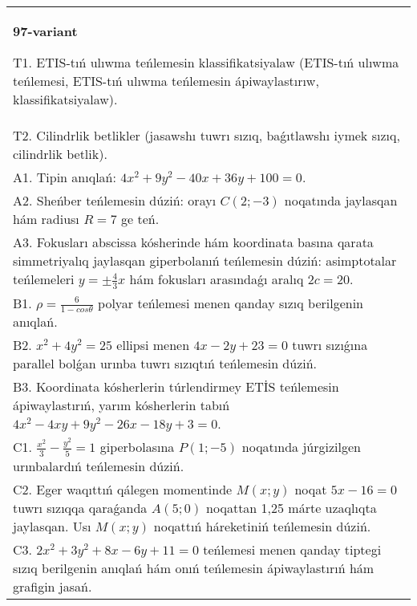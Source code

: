 \documentclass{article}
\begin{document}
\begin{tabular}{m{17cm}}
\textbf{97-variant}
\newline

T1. ETIS-tıń ulıwma teńlemesin klassifikatsiyalaw (ETIS-tıń ulıwma teńlemesi, ETIS-tıń ulıwma teńlemesin ápiwaylastırıw, klassifikatsiyalaw).\\

T2. Cilindrlik betlikler (jasawshı tuwrı sızıq, baǵıtlawshı iymek sızıq, cilindrlik betlik).\\

A1. Tipin anıqlań: $4 x^2+9 y^2-40 x+36 y+100=0$.\\

A2. Sheńber teńlemesin dúziń: orayı $C (2;-3) $ noqatında jaylasqan hám radiusı $R=7$ ge teń.\\

A3. Fokusları abscissa kósherinde hám koordinata basına qarata simmetriyalıq jaylasqan giperbolanıń teńlemesin dúziń: asimptotalar teńlemeleri $y=\pm \frac{4}{3}x$ hám fokusları arasındaǵı aralıq $2 c=20$.\\

B1. $\rho = \frac{6}{1 - cos\theta}$ polyar teńlemesi menen qanday sızıq berilgenin anıqlań.  \\

B2. $x^{2} + 4y^{2} = 25$ ellipsi menen $4x - 2y + 23 = 0$ tuwrı sızıǵına parallel bolǵan urınba tuwrı sızıqtıń teńlemesin dúziń.  \\

B3. Koordinata kósherlerin túrlendirmey ETİS teńlemesin ápiwaylastırıń, yarım kósherlerin tabıń $4x^{2} - 4xy + 9y^{2} - 26x - 18y + 3 = 0$.\\

C1. $\frac{x^{2}}{3} - \frac{y^{2}}{5} = 1$ giperbolasına $P(1; - 5)$ noqatında júrgizilgen urınbalardıń teńlemesin dúziń.\\

C2. Eger waqıttıń qálegen momentinde $M(x;y)$ noqat $5x - 16 = 0$ tuwrı sızıqqa qaraǵanda $A(5;0)$ noqattan 1,25 márte uzaqlıqta jaylasqan. Usı $M(x;y)$ noqattıń háreketiniń teńlemesin dúziń.  \\

C3. $2x^{2} + 3y^{2} + 8x - 6y + 11 = 0$ teńlemesi menen qanday tiptegi sızıq berilgenin anıqlań hám onıń teńlemesin ápiwaylastırıń hám grafigin jasań.  \\

\end{tabular}
\vspace{1cm}
\end{document}
